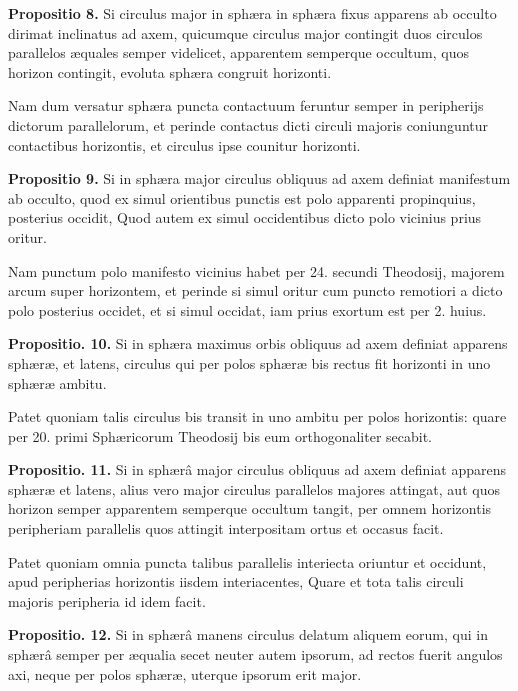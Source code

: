 \documentclass[11pt,a4paper]{article}
\begin{document}
\textbf{Propositio 8.} Si circulus major in sphæra in sphæra fixus apparens ab occulto dirimat inclinatus ad axem, quicumque circulus major contingit duos circulos parallelos æquales semper videlicet, apparentem semperque occultum, quos horizon contingit, evoluta sphæra congruit horizonti.

Nam dum versatur sphæra puncta contactuum feruntur semper in peripherijs dictorum parallelorum, et perinde contactus dicti circuli majoris coniunguntur contactibus horizontis, et circulus ipse counitur horizonti.

\textbf{Propositio 9.} Si in sphæra major circulus obliquus ad axem definiat manifestum ab occulto, quod ex simul orientibus punctis est polo apparenti propinquius, posterius occidit, Quod autem ex simul occidentibus dicto polo vicinius prius oritur.

Nam punctum polo manifesto vicinius habet per 24. secundi Theodosij, majorem arcum super horizontem, et perinde si simul oritur cum puncto remotiori a dicto polo posterius occidet, et si simul occidat, iam prius exortum est per 2. huius.

\textbf{Propositio. 10.} Si in sphæra maximus orbis obliquus ad axem definiat apparens sphæræ, et latens, circulus qui per polos sphæræ bis rectus fit horizonti in uno sphæræ ambitu.

Patet quoniam talis circulus bis transit in uno ambitu per polos horizontis: quare per 20. primi Sphæricorum Theodosij bis eum orthogonaliter secabit.

\textbf{Propositio. 11.} Si in sphærâ major circulus obliquus ad axem definiat apparens sphæræ et latens, alius vero major circulus parallelos majores attingat, aut quos horizon semper apparentem semperque occultum tangit, per omnem horizontis peripheriam parallelis quos attingit interpositam ortus et occasus  facit.

Patet quoniam omnia puncta talibus parallelis interiecta oriuntur et occidunt, apud peripherias horizontis iisdem interiacentes, Quare et tota talis circuli majoris peripheria id idem facit.

\textbf{Propositio. 12.} Si in sphærâ manens circulus delatum aliquem eorum, qui in sphærâ semper per æqualia secet neuter autem ipsorum, ad rectos fuerit angulos axi, neque per polos sphæræ, uterque ipsorum erit major.
\end{document}
